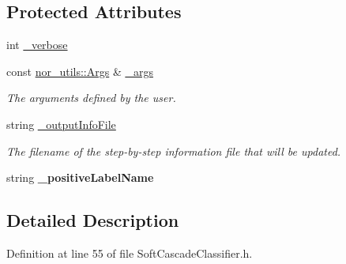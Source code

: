 \subsection*{Protected Attributes}
\begin{DoxyCompactItemize}
\item 
int \hyperlink{classMultiBoost_1_1SoftCascadeClassifier_a5aea191918b57fc141dbe4cc83a15ba2}{\-\_\-verbose}
\item 
\hypertarget{classMultiBoost_1_1SoftCascadeClassifier_ab152e1fc07b0e0a3d1b73bd6c9d5e482}{const \hyperlink{classnor__utils_1_1Args}{nor\-\_\-utils\-::\-Args} \& \hyperlink{classMultiBoost_1_1SoftCascadeClassifier_ab152e1fc07b0e0a3d1b73bd6c9d5e482}{\-\_\-args}}\label{classMultiBoost_1_1SoftCascadeClassifier_ab152e1fc07b0e0a3d1b73bd6c9d5e482}

\begin{DoxyCompactList}\small\item\em The arguments defined by the user. \end{DoxyCompactList}\item 
\hypertarget{classMultiBoost_1_1SoftCascadeClassifier_af3ab5bc7b215b0a521d55a47f0a0748f}{string \hyperlink{classMultiBoost_1_1SoftCascadeClassifier_af3ab5bc7b215b0a521d55a47f0a0748f}{\-\_\-output\-Info\-File}}\label{classMultiBoost_1_1SoftCascadeClassifier_af3ab5bc7b215b0a521d55a47f0a0748f}

\begin{DoxyCompactList}\small\item\em The filename of the step-\/by-\/step information file that will be updated. \end{DoxyCompactList}\item 
\hypertarget{classMultiBoost_1_1SoftCascadeClassifier_a63d4537dfe8865ffc71bb5f3d7b4aa3d}{string {\bfseries \-\_\-positive\-Label\-Name}}\label{classMultiBoost_1_1SoftCascadeClassifier_a63d4537dfe8865ffc71bb5f3d7b4aa3d}

\end{DoxyCompactItemize}


\subsection{Detailed Description}


Definition at line 55 of file Soft\-Cascade\-Classifier.\-h.



